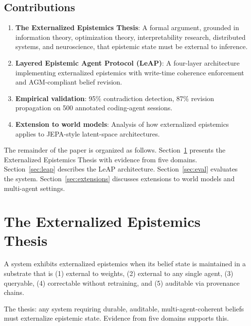 \documentclass[11pt,letterpaper]{article}
\begin{document}
\subsection{Contributions}

\begin{enumerate}[noitemsep]
    \item \textbf{The Externalized Epistemics Thesis}: A formal argument, grounded in information theory, optimization theory, interpretability research, distributed systems, and neuroscience, that epistemic state must be external to inference.

    \item \textbf{Layered Epistemic Agent Protocol (LeAP)}: A four-layer architecture implementing externalized epistemics with write-time coherence enforcement and AGM-compliant belief revision.

    \item \textbf{Empirical validation}: 95\% contradiction detection, 87\% revision propagation on 500 annotated coding-agent sessions.

    \item \textbf{Extension to world models}: Analysis of how externalized epistemics applies to JEPA-style latent-space architectures.
\end{enumerate}

The remainder of the paper is organized as follows. Section~\ref{sec:thesis} presents the Externalized Epistemics Thesis with evidence from five domains. Section~\ref{sec:leap} describes the LeAP architecture. Section~\ref{sec:eval} evaluates the system. Section~\ref{sec:extensions} discusses extensions to world models and multi-agent settings.

\section{The Externalized Epistemics Thesis}
\label{sec:thesis}

A system exhibits externalized epistemics when its belief state is maintained in a substrate that is (1) external to weights, (2) external to any single agent, (3) queryable, (4) correctable without retraining, and (5) auditable via provenance chains.

The thesis: any system requiring durable, auditable, multi-agent-coherent beliefs must externalize epistemic state. Evidence from five domains supports this.
\end{document}
